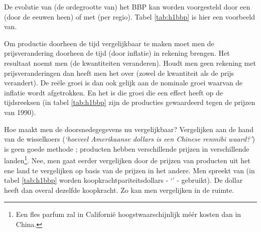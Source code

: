 \par De evolutie van (de ordegrootte van) het BBP kan worden voorgesteld door een  (door de eeuwen heen) of met  (per regio). Tabel \ref{tab:h1bbp} is hier een voorbeeld van. 
\par Om productie doorheen de tijd vergelijkbaar te maken moet men de prijsverandering doorheen de tijd (door inflatie) in rekening brengen. Het resultaat noemt men  (de kwantiteiten veranderen). Houdt men geen rekening met prijsveranderingen dan heeft men het over  (zowel de kwantiteit als de prijs verandert). De re\"ele groei is dan ook gelijk aan de nominale groei waarvan de inflatie wordt afgetrokken. En het is die groei die een effect heeft op de tijdsreeksen (in tabel \ref{tab:h1bbp} zijn de producties gewaardeerd tegen de prijzen van 1990).
\par Hoe maakt men de doorsnedegegevens nu vergelijkbaar? Vergelijken aan de hand van de wisselkoers (\textit{`hoeveel Amerikaanse dollars is een Chinese renmibi waard?'}) is geen goede methode ; producten hebben verschillende prijzen in verschillende landen\footnote{Een fles parfum zal in Californi\"e hoogstwaarschijnlijk m\'e\'er kosten dan in China.}. Nee, men gaat eerder vergelijken door de prijzen van producten uit het ene land te vergelijken op basis van de prijzen in het andere. Men spreekt van  (in tabel \ref{tab:h1bbp} worden koopkrachtpariteitsdollars - `' - gebruikt). De dollar heeft dan overal dezelfde koopkracht. Zo kan men vergelijken in de ruimte.\\

